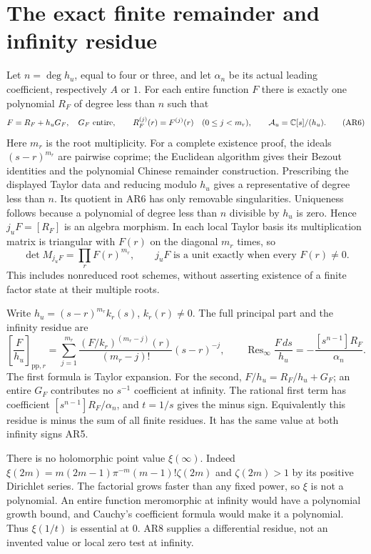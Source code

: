 \documentclass[11pt]{article}
\newcommand{\C}{\mathbb C}
\begin{document}
\section{The exact finite remainder and infinity residue}
Let $n=\deg h_u$, equal to four or three, and let $\alpha_n$
be its actual leading coefficient, respectively $A$ or $1$.
For each entire function $F$ there is exactly one polynomial
$R_F$ of degree less than $n$ such that
\begin{equation}
F=R_F+h_uG_F,\quad G_F\text{ entire},\qquad
R_F^{(j)}(r)=F^{(j)}(r)\quad(0\le j<m_r),\qquad
{\cal A}_u=\C[s]/(h_u).
\tag{AR6}
\end{equation}
Here $m_r$ is the root multiplicity. For a complete existence
proof, the ideals $(s-r)^{m_r}$ are pairwise coprime; the
Euclidean algorithm gives their Bezout identities and the
polynomial Chinese remainder construction. Prescribing the
displayed Taylor data and reducing modulo $h_u$ gives a
representative of degree less than $n$. Its quotient in AR6
has only removable singularities. Uniqueness follows because
a polynomial of degree less than $n$ divisible by $h_u$ is
zero. Hence $j_uF=[R_F]$ is an algebra morphism.
In each local Taylor basis its multiplication matrix is
triangular with $F(r)$ on the diagonal $m_r$ times, so
\begin{equation}
\det M_{j_uF}=\prod_rF(r)^{m_r},\qquad
j_uF\text{ is a unit exactly when every }F(r)\ne0.
\tag{AR7}
\end{equation}
This includes nonreduced root schemes, without asserting
existence of a finite factor state at their multiple roots.

Write $h_u=(s-r)^{m_r}k_r(s)$, $k_r(r)\ne0$. The full
principal part and the infinity residue are
\begin{equation}
\left[\frac{F}{h_u}\right]_{\mathrm{pp},r}
=\sum_{j=1}^{m_r}\frac{(F/k_r)^{(m_r-j)}(r)}{(m_r-j)!}
 (s-r)^{-j},\qquad
\operatorname{Res}_\infty\frac{F\,ds}{h_u}
=-\frac{[s^{n-1}]R_F}{\alpha_n}.
\tag{AR8}
\end{equation}
The first formula is Taylor expansion. For the second,
$F/h_u=R_F/h_u+G_F$; an entire $G_F$ contributes no
$s^{-1}$ coefficient at infinity. The rational first term
has coefficient $[s^{n-1}]R_F/\alpha_n$, and $t=1/s$
gives the minus sign. Equivalently this residue is minus
the sum of all finite residues. It has the same value at
both infinity signs AR5.

There is no holomorphic point value $\xi(\infty)$.
Indeed $\xi(2m)=m(2m-1)\pi^{-m}(m-1)!\zeta(2m)$ and
$\zeta(2m)>1$ by its positive Dirichlet series. The factorial
grows faster than any fixed power, so $\xi$ is not a polynomial.
An entire function meromorphic at infinity would have a
polynomial growth bound, and Cauchy's coefficient formula would
make it a polynomial. Thus $\xi(1/t)$ is essential at $0$.
AR8 supplies a differential residue, not an invented value
or local zero test at infinity.
\end{document}

